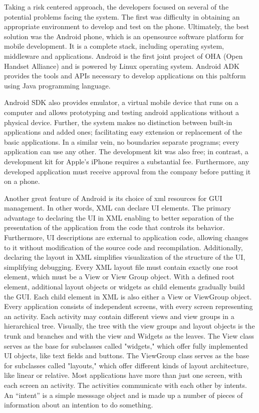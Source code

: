 \documentclass[acmtocl]{acmtrans2m}
\begin{document}
Taking a risk centered approach, the developers focused on several of the potential problems facing the system.  The first was difficulty in obtaining an appropriate environment to develop and test on the phone.  Ultimately, the best solution was the Android phone, which is an opensource software platform for mobile development. It is a complete stack, including operating system, middleware and applications.  Android is the first joint project of OHA (Open Handset Alliance) and is powered by Linux operating system. Android ADK provides the tools and APIs necessary to develop applications on this paltform using Java programming language.

Android SDK also provides emulator, a virtual mobile device that runs on a computer and allows prototyping and testing android applications without a physical device.  Further, the system makes no distinction between built-in applications and added ones; facilitating easy extension or replacement of the basic applications.  In a similar vein, no boundaries separate programs; every application can use any other.  The development kit was also free; in contrast, a development kit for Apple's iPhone requires a substantial fee.  Furthermore, any developed application must receive approval from the company before putting it on a phone.  

Another great feature of Android is its choice of xml resources for GUI management. In other words, XML can declare UI elements. The primary advantage to declaring the UI in XML enabling to better separation of the presentation of the application from the code that controls its behavior. Furthermore, UI descriptions are external to application code, allowing changes to it without modification of the source code and recompilation. Additionally, declaring the layout in XML simplifies visualization of the structure of the UI, simplifying debugging. Every XML layout file must contain exactly one root element, which must be a View or View Group object. With a defined root element, additional layout objects or widgets as child elements gradually build the GUI.  Each child element in XML is also either a View or ViewGroup object.
Every application consists of independent screens, with every screen representing an activity. Each activity may contain different views and view groups in a hierarchical tree. Visually, the tree with the view groups and layout objects is the trunk and branches and with the view and Widgets as the leaves. The View class serves as the base for subclasses called "widgets," which offer fully implemented UI objects, like text fields and buttons. The ViewGroup class serves as the base for subclasses called "layouts," which offer different kinds of layout architecture, like linear or relative.  Most applications have more than just one screen, with each screen an activity.    The activities communicate with each other by intents. An “intent” is a simple messsage object and is made up a number of pieces of information about an intention to do something.
\end{document}
